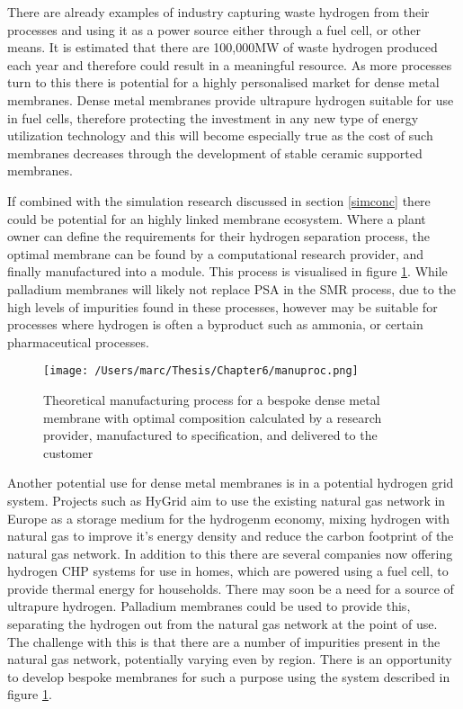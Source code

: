 There are already examples of industry capturing waste hydrogen from their processes and using it as a power source either through a fuel cell, or other means.\cite{doi:10.1177/0144598719839767} It is estimated that there are 100,000MW of waste hydrogen produced each year and therefore could result in a meaningful resource. \cite{cox} As more processes turn to this there is potential for a highly personalised market for dense metal membranes. Dense metal membranes provide ultrapure hydrogen suitable for use in fuel cells, therefore protecting the investment in any new type of energy utilization technology and this will become especially true as the cost of such membranes decreases through the development of stable ceramic supported membranes.

If combined with the simulation research discussed in section \ref{simconc} there could be potential for an highly linked membrane ecosystem. Where a plant owner can define the requirements for their hydrogen separation process, the optimal membrane can be found by a computational research provider, and finally manufactured into a module. This process is visualised in figure \ref{manuproc}. While palladium membranes will likely not replace PSA in the SMR process, due to the high levels of impurities found in these processes, however may be suitable for processes where hydrogen is often a byproduct such as ammonia, or certain pharmaceutical processes. 

\begin{figure}
    \centering
    \texttt{[image: /Users/marc/Thesis/Chapter6/manuproc.png]}
    \caption{Theoretical manufacturing process for a bespoke dense metal membrane with optimal composition calculated by a research provider, manufactured to specification, and delivered to the customer}
    \label{manuproc}
\end{figure}

Another potential use for dense metal membranes is in a potential hydrogen grid system. Projects such as HyGrid \cite{hygrid} aim to use the existing natural gas network in Europe as a storage medium for the hydrogenm economy, mixing hydrogen with natural gas to improve it's energy density and reduce the carbon footprint of the natural gas network. In addition to this there are several companies now offering hydrogen CHP systems for use in homes, which are powered using a fuel cell, to provide thermal energy for households.\cite{giacomini} There may soon be a need for a source of ultrapure hydrogen. Palladium membranes could be used to provide this, separating the hydrogen out from the natural gas network at the point of use. The challenge with this is that there are a number of impurities present in the natural gas network, potentially varying even by region. There is an opportunity to develop bespoke membranes for such a purpose using the system described in figure \ref{manuproc}.

